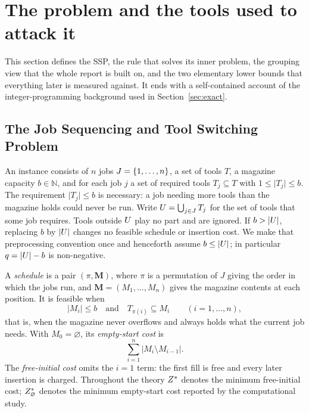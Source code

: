 \section{The problem and the tools used to attack it}\label{sec:prelim}

This section defines the SSP, the rule that solves its inner problem, the
grouping view that the whole report is built on, and the two elementary lower
bounds that everything later is measured against. It ends with a self-contained
account of the integer-programming background used in Section~\ref{sec:exact}.

\subsection{The Job Sequencing and Tool Switching Problem}\label{ssec:ssp}

An instance consists of $n$ jobs $J=\{1,\dots,n\}$, a set of tools $T$, a
magazine capacity $b\in\mathbb{N}$, and for each job $j$ a set of required tools
$T_j\subseteq T$ with $1\le\lvert T_j\rvert\le b$. The requirement
$\lvert T_j\rvert\le b$ is necessary: a job needing more tools than the magazine
holds could never be run. Write $U=\bigcup_{j\in J}T_j$ for the set of tools that
some job requires. Tools outside $U$ play no part and are ignored.
If $b>\lvert U\rvert$, replacing $b$ by $\lvert U\rvert$ changes no feasible
schedule or insertion cost. We make that preprocessing convention once and henceforth
assume $b\le\lvert U\rvert$; in particular $q=\lvert U\rvert-b$ is non-negative.

\begin{definition}\label{def:ssp}
A \emph{schedule} is a pair $(\pi,\mathbf{M})$, where $\pi$ is a permutation of $J$
giving the order in which the jobs run, and $\mathbf{M}=(M_1,\dots,M_n)$ gives the
magazine contents at each position. It is feasible when
\[
  \lvert M_i\rvert\le b \quad\text{and}\quad T_{\pi(i)}\subseteq M_i
  \qquad (i=1,\dots,n),
\]
that is, when the magazine never overflows and always holds what the current job
  needs. With $M_0=\varnothing$, its \emph{empty-start cost} is
\[
  \sum_{i=1}^{n}\lvert M_i\setminus M_{i-1}\rvert .
\]
The \emph{free-initial cost} omits the $i=1$ term: the first fill is free and every
later insertion is charged. Throughout the theory $Z^{\ast}$ denotes the minimum
free-initial cost; $Z^{\ast}_{\varnothing}$ denotes the minimum empty-start cost reported by the
computational study.
\end{definition}

